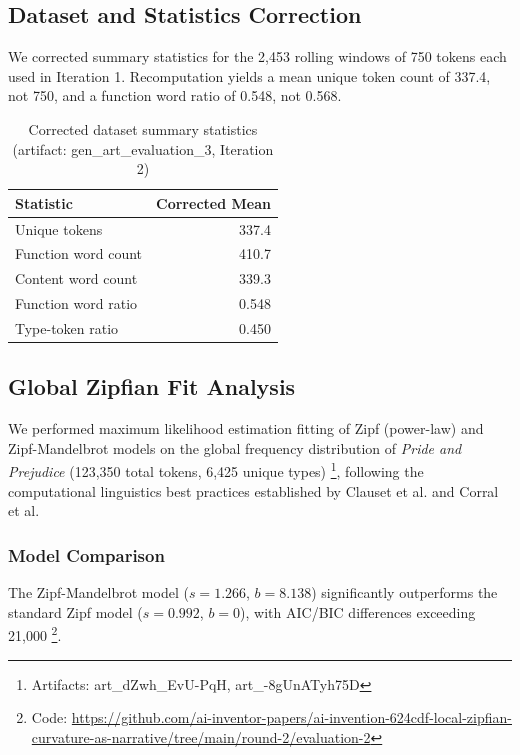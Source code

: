 \documentclass[11pt,letterpaper]{article}
\begin{document}
\subsection{Dataset and Statistics Correction}

We corrected summary statistics for the 2,453 rolling windows of 750 tokens each used in Iteration 1. Recomputation yields a mean unique token count of 337.4, not 750, and a function word ratio of 0.548, not 0.568.

\begin{table}[!htbp]
\centering
\caption{Corrected dataset summary statistics (artifact: gen\_art\_evaluation\_3, Iteration 2)}
\label{tab:corrected_stats}
\begin{tabular}{lr}
\toprule
Statistic & Corrected Mean \\
\midrule
Unique tokens & 337.4 \\
Function word count & 410.7 \\
Content word count & 339.3 \\
Function word ratio & 0.548 \\
Type-token ratio & 0.450 \\
\bottomrule
\end{tabular}
\end{table}

\subsection{Global Zipfian Fit Analysis}

We performed maximum likelihood estimation fitting of Zipf (power-law) and Zipf-Mandelbrot models on the global frequency distribution of \textit{Pride and Prejudice} (123,350 total tokens, 6,425 unique types) \footnote{Artifacts: art\_dZwh\_EvU-PqH, art\_-8gUnATyh75D}, following the computational linguistics best practices established by Clauset et al. and Corral et al.

\subsubsection{Model Comparison}

The Zipf-Mandelbrot model ($s=1.266$, $b=8.138$) significantly outperforms the standard Zipf model ($s=0.992$, $b=0$), with AIC/BIC differences exceeding 21,000 \footnote{Code: \url{https://github.com/ai-inventor-papers/ai-invention-624cdf-local-zipfian-curvature-as-narrative/tree/main/round-2/evaluation-2}}.
\end{document}
